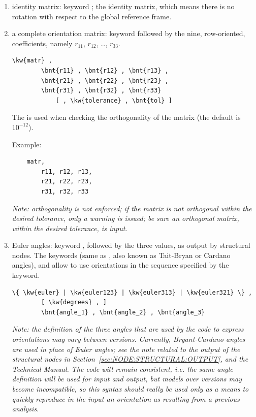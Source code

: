 \begin{enumerate}
\item identity matrix: keyword ; the identity matrix,
which means there is no rotation with respect to the global reference
frame.

\item a complete orientation matrix: keyword 
followed by the nine, row-oriented, coefficients, namely
$ r_{11} $, $ r_{12} $, \ldots, $ r_{33} $.
\begin{Verbatim}[commandchars=\\\{\}]
    \kw{matr} ,
        \bnt{r11} , \bnt{r12} , \bnt{r13} ,
        \bnt{r21} , \bnt{r22} , \bnt{r23} ,
        \bnt{r31} , \bnt{r32} , \bnt{r33}
            [ , \kw{tolerance} , \bnt{tol} ]
\end{Verbatim}
The   is used when checking the orthogonality of the matrix (the default is $10^{-12}$).

\noindent
Example:
\begin{verbatim}
    matr,
        r11, r12, r13,
        r21, r22, r23,
        r31, r32, r33
\end{verbatim}
\emph{Note: orthogonality is not enforced; if the matrix is not orthogonal within the desired tolerance, only a warning is issued; be sure an orthogonal
matrix, within the desired tolerance, is input}.

\item Euler angles: keyword , followed by the three
values, as output by structural nodes.
The keywords  (same as , also known as Tait-Bryan or Cardano angles),  and 
allow to use orientations in the sequence specified by the keyword.
\begin{Verbatim}[commandchars=\\\{\}]
    \{ \kw{euler} | \kw{euler123} | \kw{euler313} | \kw{euler321} \} ,
        [ \kw{degrees} , ]
        \bnt{angle_1} , \bnt{angle_2} , \bnt{angle_3}
\end{Verbatim}

\emph{Note: the definition of the three angles that are used 
by the code to express orientations may vary between versions.
Currently, Bryant-Cardano angles are used in place of Euler
angles; see the note related to the output of the structural nodes
in Section~\ref{sec:NODE:STRUCTURAL:OUTPUT}, and the Technical Manual.
The code will remain consistent, i.e. the same angle
definition will be used for input and output, but models
over versions may become incompatible, so this syntax should 
really be used only as a means to quickly reproduce in the input
an orientation as resulting from a previous analysis.}


\end{enumerate}

